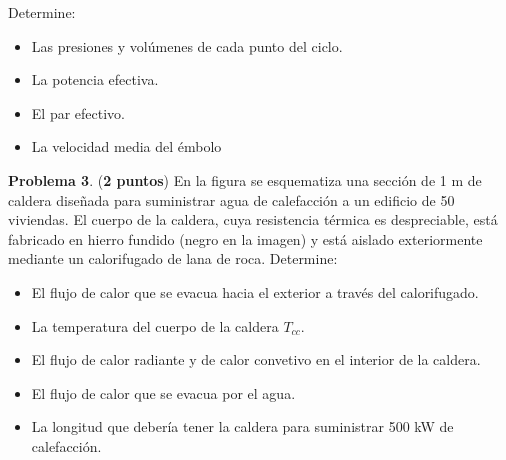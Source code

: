 \documentclass[12pt]{article}
\begin{document}
Determine:
\begin{itemize}
    \item Las presiones y volúmenes de cada punto del ciclo.
    \item La potencia efectiva.
    \item El par efectivo.
    \item La velocidad media del émbolo
\end{itemize}

\textbf{Problema 3}. (\textbf{2 puntos}) En la figura se esquematiza una sección de 1 m de caldera diseñada para suministrar agua de calefacción a un edificio de 50 viviendas. El cuerpo de la caldera, cuya resistencia térmica es despreciable, está fabricado en hierro fundido (negro en la imagen) y está aislado exteriormente mediante un calorifugado de lana de roca. Determine:
\begin{itemize}
    \item El flujo de calor que se evacua hacia el exterior a través del calorifugado.
    \item La temperatura del cuerpo de la caldera $T _{cc}$.
    \item El flujo de calor radiante y de calor convetivo en el interior de la caldera.
    \item El flujo de calor que se evacua por el agua.
    \item La longitud que debería tener la caldera para suministrar 500 kW de calefacción.
\end{itemize}
\end{document}
